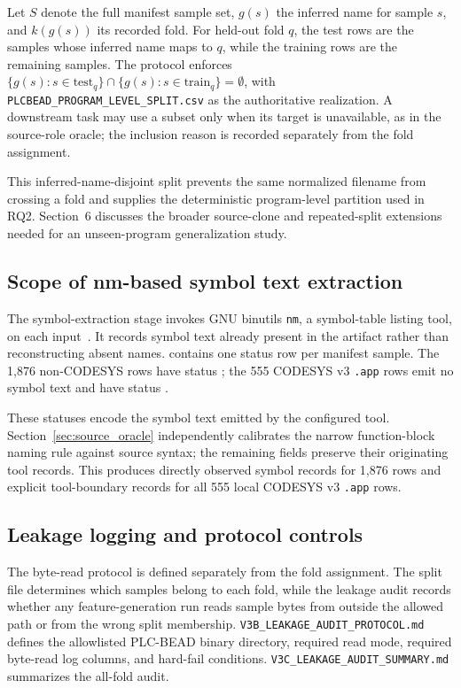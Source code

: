 \documentclass[a4paper,fleqn]{cas-dc}
\begin{document}
Let $S$ denote the full manifest sample set, $g(s)$ the inferred name for sample $s$, and $k(g(s))$ its recorded fold. For held-out fold $q$, the test rows are the samples whose inferred name maps to $q$, while the training rows are the remaining samples. The protocol enforces $\{g(s): s \in \mathrm{test}_q\} \cap \{g(s): s \in \mathrm{train}_q\} = \emptyset$, with \texttt{PLCBEAD\_PROGRAM\_LEVEL\_SPLIT.csv} as the authoritative realization. A downstream task may use a subset only when its target is unavailable, as in the source-role oracle; the inclusion reason is recorded separately from the fold assignment.

This inferred-name-disjoint split prevents the same normalized filename from crossing a fold and supplies the deterministic program-level partition used in RQ2. Section~6 discusses the broader source-clone and repeated-split extensions needed for an unseen-program generalization study.

\subsection{Scope of nm-based symbol text extraction}

The symbol-extraction stage invokes GNU binutils \texttt{nm}, a symbol-table listing tool, on each input~\citep{gnu_binutils_nm}. It records symbol text already present in the artifact rather than reconstructing absent names.  contains one status row per manifest sample. The 1{,}876 non-CODESYS rows have status ; the 555 CODESYS v3 \texttt{.app} rows emit no symbol text and have status .

These statuses encode the symbol text emitted by the configured tool. Section~\ref{sec:source_oracle} independently calibrates the narrow function-block naming rule against source syntax; the remaining fields preserve their originating tool records. This produces directly observed symbol records for 1{,}876 rows and explicit tool-boundary records for all 555 local CODESYS v3 \texttt{.app} rows.

\subsection{Leakage logging and protocol controls}

The byte-read protocol is defined separately from the fold assignment. The split file determines which samples belong to each fold, while the leakage audit records whether any feature-generation run reads sample bytes from outside the allowed path or from the wrong split membership. \texttt{V3B\_LEAKAGE\_AUDIT\_PROTOCOL.md} defines the allowlisted PLC-BEAD binary directory, required read mode, required byte-read log columns, and hard-fail conditions. \texttt{V3C\_LEAKAGE\_AUDIT\_SUMMARY.md} summarizes the all-fold audit.
\end{document}

